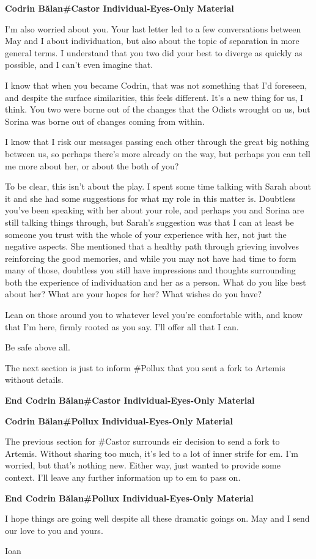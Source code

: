 \textbf{Codrin Bălan\#Castor Individual-Eyes-Only Material}

I'm also worried about you. Your last letter led to a few conversations between May and I about individuation, but also about the topic of separation in more general terms. I understand that you two did your best to diverge as quickly as possible, and I can't even imagine that.

I know that when you became Codrin, that was not something that I'd foreseen, and despite the surface similarities, this feels different. It's a new thing for us, I think. You two were borne out of the changes that the Odists wrought on us, but Sorina was borne out of changes coming from within.

I know that I risk our messages passing each other through the great big nothing between us, so perhaps there's more already on the way, but perhaps you can tell me more about her, or about the both of you?

To be clear, this isn't about the play. I spent some time talking with Sarah about it and she had some suggestions for what my role in this matter is. Doubtless you've been speaking with her about your role, and perhaps you and Sorina are still talking things through, but Sarah's suggestion was that I can at least be someone you trust with the whole of your experience with her, not just the negative aspects. She mentioned that a healthy path through grieving involves reinforcing the good memories, and while you may not have had time to form many of those, doubtless you still have impressions and thoughts surrounding both the experience of individuation and her as a person. What do you like best about her? What are your hopes for her? What wishes do you have?

Lean on those around you to whatever level you're comfortable with, and know that I'm here, firmly rooted as you say. I'll offer all that I can.

Be safe above all.

The next section is just to inform \#Pollux that you sent a fork to Artemis without details.

\textbf{End Codrin Bălan\#Castor Individual-Eyes-Only Material}

\textbf{Codrin Bălan\#Pollux Individual-Eyes-Only Material}

The previous section for \#Castor surrounds eir decision to send a fork to Artemis. Without sharing too much, it's led to a lot of inner strife for em. I'm worried, but that's nothing new. Either way, just wanted to provide some context. I'll leave any further information up to em to pass on.

\textbf{End Codrin Bălan\#Pollux Individual-Eyes-Only Material}

I hope things are going well despite all these dramatic goings on. May and I send our love to you and yours.

Ioan
